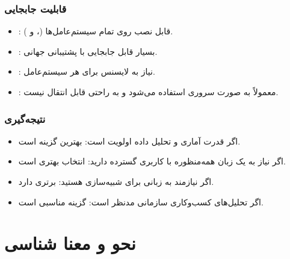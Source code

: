 \documentclass[11pt, a4paper, oneside]{book}
\begin{document}
				
			\subsection{قابلیت جابجایی}
				
				\begin{itemize}
					
					\item {\large {}}:
					{\normalsize قابل نصب روی تمام سیستم‌عامل‌ها (،  و ).}
					
					\item {\large {}}:
					{\normalsize بسیار قابل جابجایی با پشتیبانی جهانی.}
					
					\item {\large {}}:
					{\normalsize نیاز به لایسنس برای هر سیستم‌عامل.}
					
					\item {\large {}}:
					{\normalsize معمولاً به صورت سروری استفاده می‌شود و به راحتی قابل انتقال نیست.}
					
				\end{itemize}
				
			\subsection{نتیجه‌گیری}
				
				\begin{itemize}
					
					\item {\large اگر قدرت آماری و تحلیل داده اولویت است}:
					{\normalsize {} بهترین گزینه است.}
					
					\item {\large اگر نیاز به یک زبان همه‌منظوره با کاربری گسترده دارید}:
					{\normalsize {} انتخاب بهتری است.}
					
					\item {\large اگر نیازمند به زبانی برای شبیه‌سازی هستید}:
					{\normalsize {} برتری دارد.}
					
					\item {\large اگر تحلیل‌های کسب‌وکاری سازمانی مدنظر است}:
					{\normalsize {} گزینه مناسبی است.}
					
				\end{itemize}

	
	
	\chapter{نحو و معنا شناسی}
	
\end{document}
